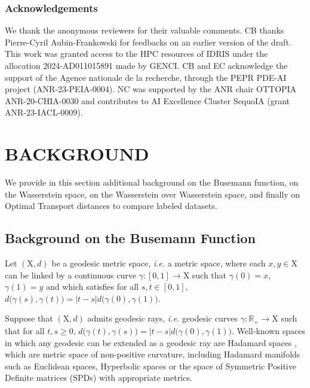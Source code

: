 \documentclass[twoside]{article}
\newcommand{\R}{\mathbb{R}}
\newcommand{\X}{\mathrm{X}}
\begin{document}
\makeatletter
\subsubsection*{Acknowledgements}

We thank the anonymous reviewers for their valuable comments. CB thanks Pierre-Cyril Aubin-Frankowski for feedbacks on an earlier version of the draft. This work was granted access to the HPC resources of IDRIS under the allocation 2024-AD011015891 made by GENCI. CB and EC acknowledge the support of the Agence nationale de la recherche, through the PEPR PDE-AI project (ANR-23-PEIA-0004). NC was supported by the ANR chair OTTOPIA ANR-20-CHIA-0030 and contributes to  AI Excellence Cluster SequoIA (grant ANR-23-IACL-0009).









\clearpage
\appendix
\thispagestyle{empty}

\onecolumn
{}

\section{BACKGROUND}

We provide in this section additional background on the Busemann function, on the Wasserstein space, on the Wasserstein over Wasserstein space, and finally on Optimal Transport distances to compare labeled datasets.


\subsection{Background on the Busemann Function} \label{app:bg_busemann}

Let $(\X, d)$ be a  geodesic metric space, \emph{i.e.} a metric space, where each $x,y\in\X$ can be linked by a continuous curve $\gamma:[0,1]\to \X$ such that $\gamma(0)=x$, $\gamma(1)=y$ and which satisfies for all $s,t\in [0,1]$, $d\big(\gamma(s),\gamma(t)\big) = |t-s| d\big(\gamma(0),\gamma(1)\big)$.

Suppose that $(\X,d)$ admits geodesic rays, \emph{i.e.} geodesic curves $\gamma:\R_+\to\X$ such that for all $t,s\ge 0$, $d\big(\gamma(t),\gamma(s)\big) = |t-s| d\big(\gamma(0),\gamma(1)\big)$. Well-known spaces in which any geodesic can be extended as a geodesic ray are Hadamard spaces \citep{bridson2013metric}, which are metric space of non-positive curvature, including Hadamard manifolds such as Euclidean spaces, Hyperbolic spaces or the space of Symmetric Positive Definite matrices (SPDs) with appropriate metrics.
\end{document}

